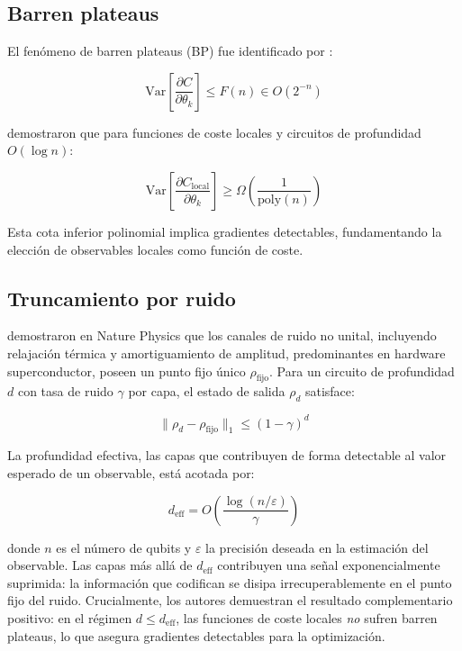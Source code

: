 \documentclass[11pt,a4paper,spanish]{book}
\begin{document}
\subsection{Barren plateaus}

El fenómeno de barren plateaus (BP) fue identificado por \citet{mcclean2018}:

\begin{equation}
\text{Var}\left[\frac{\partial C}{\partial \theta_k}\right] \leq F(n) \in O(2^{-n})
\label{eq:bp}
\end{equation}

\citet{cerezo2021} demostraron que para funciones de coste locales y circuitos de profundidad $O(\log n)$:

\begin{equation}
\text{Var}\left[\frac{\partial C_{\text{local}}}{\partial \theta_k}\right] \geq \Omega\left(\frac{1}{\text{poly}(n)}\right)
\label{eq:local_bp}
\end{equation}

\noindent Esta cota inferior polinomial implica gradientes detectables, fundamentando la elección de observables locales como función de coste.

\subsection{Truncamiento por ruido}

\citet{mele2026} demostraron en Nature Physics que los canales de ruido no unital, incluyendo relajación térmica y amortiguamiento de amplitud, predominantes en hardware superconductor, poseen un punto fijo único $\rho_{\text{fijo}}$. Para un circuito de profundidad $d$ con tasa de ruido $\gamma$ por capa, el estado de salida $\rho_d$ satisface:

\begin{equation}
\|\rho_d - \rho_{\text{fijo}}\|_1 \leq (1 - \gamma)^d
\label{eq:truncation}
\end{equation}

\noindent La profundidad efectiva, las capas que contribuyen de forma detectable al valor esperado de un observable, está acotada por:

\begin{equation}
d_{\text{eff}} = O\!\left(\frac{\log(n/\varepsilon)}{\gamma}\right)
\label{eq:depth_bound}
\end{equation}

\noindent donde $n$ es el número de qubits y $\varepsilon$ la precisión deseada en la estimación del observable. Las capas más allá de $d_{\text{eff}}$ contribuyen una señal exponencialmente suprimida: la información que codifican se disipa irrecuperablemente en el punto fijo del ruido. Crucialmente, los autores demuestran el resultado complementario positivo: en el régimen $d \leq d_{\text{eff}}$, las funciones de coste locales \emph{no} sufren barren plateaus, lo que asegura gradientes detectables para la optimización.
\end{document}
